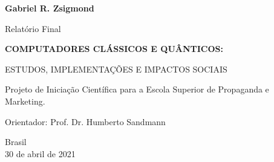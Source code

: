 \begin{titlepage}

    \begin{center}
        
        \textbf{Gabriel R. Zsigmond}
        
        \vspace{2cm}
        
        \Large
        Relatório Final
        \vspace{0.5cm}

        \LARGE
        \textbf{COMPUTADORES CLÁSSICOS E QUÂNTICOS:}
        
        \vspace{0.5cm}
        \large
        ESTUDOS, IMPLEMENTAÇÕES E IMPACTOS SOCIAIS
        
        
        \vspace{2cm}
        
        \large
        \begin{flushright}
            \begin{minipage}{10cm}
            Projeto de Iniciação Científica para a Escola Superior de Propaganda e Marketing.\linebreak[3]
            
            Orientador: Prof. Dr. Humberto Sandmann
            \end{minipage}
        \end{flushright}
        \vfill
        
        Brasil\\
        30 de abril de 2021\\
        
    \end{center}

\end{titlepage}